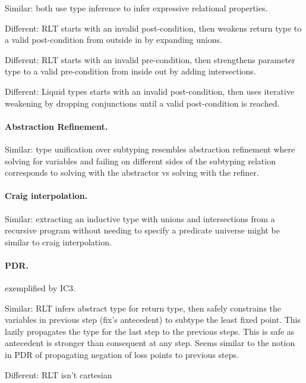 \documentclass[acmsmall]{acmart}
\begin{document}
Similar: both use type inference to infer expressive relational properties. 

Different: RLT starts with an invalid post-condition, then weakens return type to a valid post-condition from outside in by expanding unions.

Different: RLT starts with an invalid pre-condition, then strengthens parameter type to a valid pre-condition from inside out by adding intersections.

Different: Liquid types starts with an invalid post-condition, then uses iterative weakening by dropping conjunctions until a valid post-condition is reached.


\paragraph{Abstraction Refinement.} 
Similar: type unification over subtyping resembles abstraction refinement  
where solving for variables and failing on different sides of the subtyping relation corresponds to
solving with the abstractor vs solving with the refiner.

\paragraph{Craig interpolation.} 
Similar: extracting an inductive type with unions and intersections 
from a recursive program without needing to specify a predicate universe might be similar to
craig interpolation.

\paragraph{PDR.}
exemplified by IC3. 

Similar: RLT infers abstract type for return type, 
then safely constrains the variables in previous step (fix's antecedent) 
to subtype the least fixed point.
This lazily propagates the type for the last step to the previous steps.
This is safe as antecedent is stronger than consequent at any step.
Seems similar to the notion in PDR of propagating negation of loss points to previous steps. 

Different: RLT isn't cartesian
\end{document}
